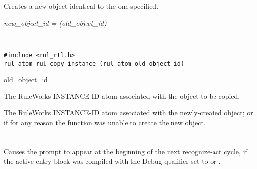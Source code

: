 \begin{seealso}


\end{seealso}

\section*{}

Creates a new object identical to the one specified.

\Syntax

\it{new\_object\_id} = (\it{old\_object\_id})

\begin{args}
 \\
\end{args}

\CBinding
\begin{verbatim}
#include <rul_rtl.h>
rul_atom rul_copy_instance (rul_atom old_object_id)
\end{verbatim}

\begin{argument}
\item[old\_object\_id]

  The RuleWorks INSTANCE-ID atom associated with the object to be
  copied.
\end{argument}

\ReturnValue

The RuleWorks INSTANCE-ID atom associated with the newly-created
object; or  if for any reason the function was
unable to create the new object.

\begin{seealso}


\end{seealso}

\section*{}

Causes the  prompt to appear at the beginning of the next
recognize-act cycle, if the active entry block was compiled with the
Debug qualifier set to  or .

